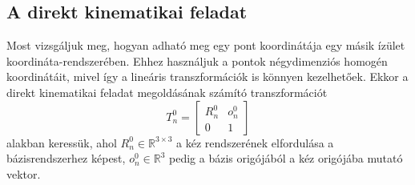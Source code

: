 \documentclass[12pt,a4paper]{report}
\theoremstyle{remark}
\theoremstyle{definition}
\begin{document}
\subsection{A direkt kinematikai feladat}

Most vizsgáljuk meg, hogyan adható meg egy pont koordinátája egy másik ízület koordináta-rendszerében. Ehhez 
használjuk a pontok négydimenziós homogén koordinátáit, mivel így a lineáris transzformációk is könnyen kezelhetőek. 
Ekkor a direkt kinematikai feladat megoldásának számító transzformációt
\begin{equation}
T^{0}_{n} = \begin{bmatrix}
    R^{0}_{n} & o^{0}_{n} \\ 
    0 & 1
    \end{bmatrix} 
\end{equation} 
alakban keressük, ahol $R^{0}_{n} \in \mathbb{R}^{3 \times 3}$ a kéz rendszerének elfordulása a bázisrendszerhez 
képest, $o^{0}_{n} \in \mathbb{R}^3$ pedig a bázis origójából a kéz origójába mutató vektor.
\end{document}
